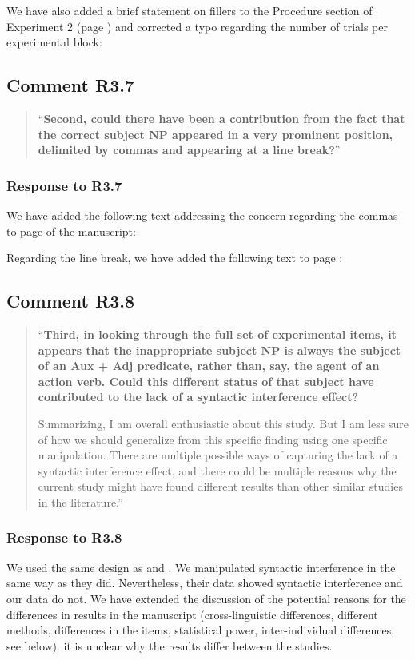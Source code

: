 \documentclass[12pt]{article}
\begin{document}

\noindent We have also added a brief statement on fillers to the Procedure section of Experiment 2 (page \pageref{fillers2}) and corrected a typo regarding the number of trials per experimental block:


\subsection*{Comment R3.7}
\begin{quote}
``\textbf{Second, could there have been a contribution from the fact that the correct subject NP appeared in a very prominent position, delimited by commas and appearing at a line break?}''
\end{quote}

\subsubsection*{Response to R3.7}
We have added the following text addressing the concern regarding the commas to page \pageref{comma} of the manuscript:


\noindent Regarding the line break, we have added the following text to page \pageref{linebreak}:



\subsection*{Comment R3.8}
\begin{quote}
``\textbf{Third, in looking through the full set of experimental items, it appears that the inappropriate subject NP is always the subject of an Aux + Adj predicate, rather than, say, the agent of an action verb. Could this different status of that subject have contributed to the lack of a syntactic interference effect?}

Summarizing, I am overall enthusiastic about this study. But I am less sure of how we should generalize from this specific finding using one specific manipulation. There are multiple possible ways of capturing the lack of a syntactic interference effect, and there could be multiple reasons why the current study might have found different results than other similar studies in the literature.''
\end{quote}

\subsubsection*{Response to R3.8}
We used the same design as \textcite{vandyke07} and \textcite{mertzen}. We manipulated syntactic interference in the same way as they did. Nevertheless, their data showed syntactic interference and our data do not. We have extended the discussion of the potential reasons for the differences in results in the manuscript (cross-linguistic differences, different methods, differences in the items, statistical power, inter-individual differences, see below).  it is unclear why the results differ between the studies. 
\end{document}
